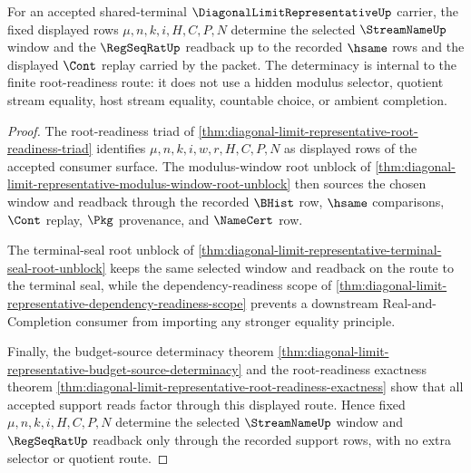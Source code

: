 \begin{theorem}
\label{thm:diagonal-limit-representative-selected-window-determinacy}
For an accepted shared-terminal $\DiagonalLimitRepresentativeUp$ carrier, the fixed displayed rows $\mu,n,k,i,H,C,P,N$ determine the selected $\StreamNameUp$ window and the $\RegSeqRatUp$ readback up to the recorded $\hsame$ rows and the displayed $\Cont$ replay carried by the packet. The determinacy is internal to the finite root-readiness route: it does not use a hidden modulus selector, quotient stream equality, host stream equality, countable choice, or ambient completion.
\end{theorem}
\begin{proof}
The root-readiness triad of \autoref{thm:diagonal-limit-representative-root-readiness-triad} identifies $\mu,n,k,i,w,r,H,C,P,N$ as displayed rows of the accepted consumer surface. The modulus-window root unblock of \autoref{thm:diagonal-limit-representative-modulus-window-root-unblock} then sources the chosen window and readback through the recorded $\BHist$ row, $\hsame$ comparisons, $\Cont$ replay, $\Pkg$ provenance, and $\NameCert$ row.

The terminal-seal root unblock of \autoref{thm:diagonal-limit-representative-terminal-seal-root-unblock} keeps the same selected window and readback on the route to the terminal seal, while the dependency-readiness scope of \autoref{thm:diagonal-limit-representative-dependency-readiness-scope} prevents a downstream Real-and-Completion consumer from importing any stronger equality principle.

Finally, the budget-source determinacy theorem \autoref{thm:diagonal-limit-representative-budget-source-determinacy} and the root-readiness exactness theorem \autoref{thm:diagonal-limit-representative-root-readiness-exactness} show that all accepted support reads factor through this displayed route. Hence fixed $\mu,n,k,i,H,C,P,N$ determine the selected $\StreamNameUp$ window and $\RegSeqRatUp$ readback only through the recorded support rows, with no extra selector or quotient route.
\end{proof}


